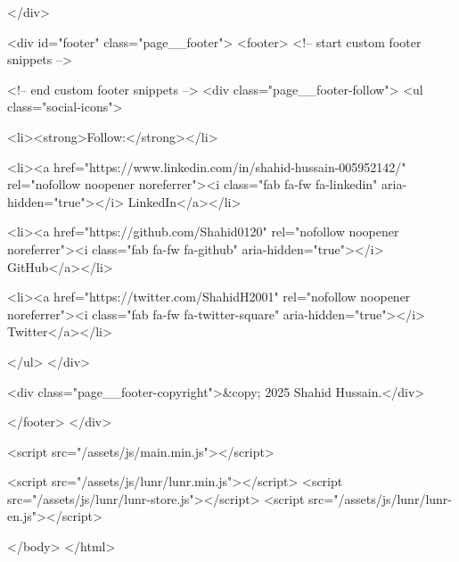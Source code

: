       </div>
    

    <div id="footer" class="page__footer">
      <footer>
        <!-- start custom footer snippets -->

<!-- end custom footer snippets -->
        <div class="page__footer-follow">
  <ul class="social-icons">
    
      <li><strong>Follow:</strong></li>
    

    
      
        
          <li><a href="https://www.linkedin.com/in/shahid-hussain-005952142/" rel="nofollow noopener noreferrer"><i class="fab fa-fw fa-linkedin" aria-hidden="true"></i> LinkedIn</a></li>
        
      
        
          <li><a href="https://github.com/Shahid0120" rel="nofollow noopener noreferrer"><i class="fab fa-fw fa-github" aria-hidden="true"></i> GitHub</a></li>
        
      
        
          <li><a href="https://twitter.com/ShahidH2001" rel="nofollow noopener noreferrer"><i class="fab fa-fw fa-twitter-square" aria-hidden="true"></i> Twitter</a></li>
        
      
    
  </ul>
</div>

<div class="page__footer-copyright">&copy; 2025 Shahid Hussain.</div>

      </footer>
    </div>

    
  <script src="/assets/js/main.min.js"></script>




<script src="/assets/js/lunr/lunr.min.js"></script>
<script src="/assets/js/lunr/lunr-store.js"></script>
<script src="/assets/js/lunr/lunr-en.js"></script>







  </body>
</html>
